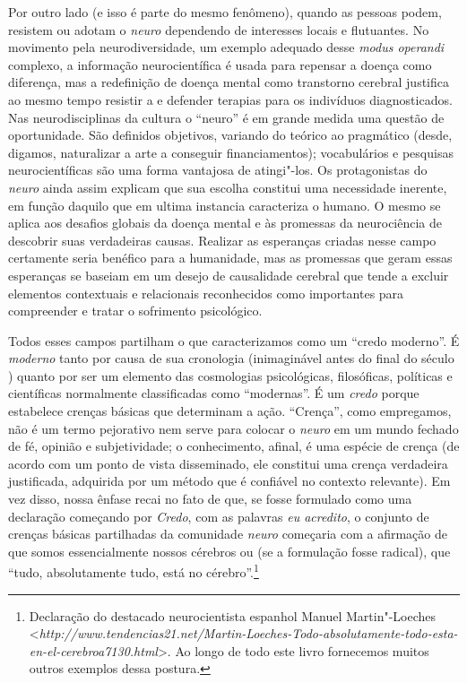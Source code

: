 Por outro lado (e isso é parte do mesmo fenômeno), quando as pessoas
podem, resistem ou adotam o \emph{neuro} dependendo de interesses locais
e flutuantes. No movimento pela neurodiversidade, um exemplo adequado
desse \emph{modus operandi} complexo, a informação neurocientífica é
usada para repensar a doença como diferença, mas a redefinição de doença
mental como transtorno cerebral justifica ao mesmo tempo resistir a e
defender terapias para os indivíduos diagnosticados. Nas
neurodisciplinas da cultura o ``neuro'' é em grande medida uma questão
de oportunidade. São definidos objetivos, variando do teórico ao
pragmático (desde, digamos, naturalizar a arte a conseguir
financiamentos); vocabulários e pesquisas neurocientíficas são uma forma
vantajosa de atingi"-los. Os protagonistas do \emph{neuro} ainda assim
explicam que sua escolha constitui uma necessidade inerente, em função
daquilo que em ultima instancia caracteriza o humano. O mesmo se aplica
aos desafios globais da doença mental e às promessas da neurociência de
descobrir suas verdadeiras causas. Realizar as esperanças criadas nesse
campo certamente seria benéfico para a humanidade, mas as promessas que
geram essas esperanças se baseiam em um desejo de causalidade cerebral
que tende a excluir elementos contextuais e relacionais reconhecidos
como importantes para compreender e tratar o sofrimento psicológico.

Todos esses campos partilham o que caracterizamos como um ``credo
moderno''. É \emph{moderno} tanto por causa de sua cronologia
(inimaginável antes do final do século ) quanto por ser um elemento
das cosmologias psicológicas, filosóficas, políticas e científicas
normalmente classificadas como ``modernas''. É um \emph{credo} porque
estabelece crenças básicas que determinam a ação. ``Crença'', como
empregamos, não é um termo pejorativo nem serve para colocar o
\emph{neuro} em um mundo fechado de fé, opinião e subjetividade; o
conhecimento, afinal, é uma espécie de crença (de acordo com um ponto de
vista disseminado, ele constitui uma crença verdadeira justificada,
adquirida por um método que é confiável no contexto relevante). Em vez
disso, nossa ênfase recai no fato de que, se fosse formulado como uma
declaração começando por \emph{Credo}, com as palavras \emph{eu
acredito}, o conjunto de crenças básicas partilhadas da comunidade
\emph{neuro} começaria com a afirmação de que somos essencialmente
nossos cérebros ou (se a formulação fosse radical), que ``tudo,
absolutamente tudo, está no cérebro''.\footnote[2]{Declaração do destacado neurocientista espanhol Manuel
Martin"-Loeches
\textless{}\emph{http://www.tendencias21.net/Martin-Loeches-Todo-absolutamente-todo-esta-en-el-cerebroa7130.html}\textgreater{}.
Ao longo de todo este livro fornecemos muitos outros exemplos dessa
postura.}

